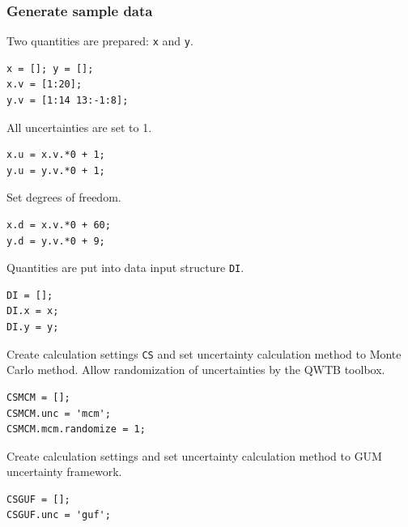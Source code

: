 \startcontents[localtoc]



{}
\subsubsection*{Generate sample data}



Two quantities are prepared: \texttt{x} and \texttt{y}.

\begin{lstlisting}
x = []; y = [];
x.v = [1:20];
y.v = [1:14 13:-1:8];
\end{lstlisting}


All uncertainties are set to 1.

\begin{lstlisting}
x.u = x.v.*0 + 1;
y.u = y.v.*0 + 1;
\end{lstlisting}


Set degrees of freedom.

\begin{lstlisting}
x.d = x.v.*0 + 60;
y.d = y.v.*0 + 9;
\end{lstlisting}


Quantities are put into data input structure \texttt{DI}.

\begin{lstlisting}
DI = [];
DI.x = x;
DI.y = y;
\end{lstlisting}


Create calculation settings \texttt{CS} and set uncertainty calculation method to Monte Carlo method.
Allow randomization of uncertainties by the QWTB toolbox.

\begin{lstlisting}
CSMCM = [];
CSMCM.unc = 'mcm';
CSMCM.mcm.randomize = 1;
\end{lstlisting}


Create calculation settings and set uncertainty calculation method to GUM uncertainty framework.

\begin{lstlisting}
CSGUF = [];
CSGUF.unc = 'guf';
\end{lstlisting}


{}
